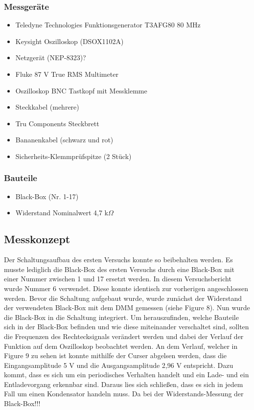 \documentclass[a4paper,12pt]{article}
\begin{document}
\subsubsection*{Messgeräte}
\begin{itemize}
\item Teledyne Technologies Funktionsgenerator T3AFG80 80 MHz
\item Keysight Oszilloskop (DSOX1102A)
\item Netzgerät (NEP-8323)?
\item Fluke 87 V True RMS Multimeter
\item Oszilloskop BNC Tastkopf mit Messklemme
\item Steckkabel (mehrere)
\item Tru Components Steckbrett
\item Bananenkabel (schwarz und rot)
\item Sicherheits-Klemmprüfspitze (2 Stück)
\end{itemize}

\subsubsection*{Bauteile}
\begin{itemize}
\item Black-Box (Nr. 1-17)
\item Widerstand Nominalwert 4,7 k$\Omega$
\end{itemize}




\subsection{Messkonzept}
Der Schaltungsaufbau des ersten Versuchs konnte so beibehalten werden. Es musste lediglich die Black-Box des ersten Versuchs durch eine Black-Box mit einer Nummer zwischen 1 und 17 ersetzt werden. In diesem Versuchsbericht wurde Nummer 6 verwendet. Diese konnte identisch zur vorherigen angeschlossen werden. Bevor die Schaltung aufgebaut wurde, wurde zunächst der Widerstand der verwendeten Black-Box mit dem DMM gemessen (siehe Figure 8). Nun wurde die Black-Box in die Schaltung integriert. Um herauszufinden, welche Bauteile sich in der Black-Box befinden und wie diese miteinander verschaltet sind, sollten die Frequenzen des Rechtecksignals verändert werden und dabei der Verlauf der Funktion auf dem Oszilloskop beobachtet werden. An dem Verlauf, welcher in Figure 9 zu sehen ist konnte mithilfe der Curser abgelsen werden, dass die Eingangsamplitude 5 V und die Ausgangsamplitude 2,96 V entspricht. Dazu kommt, dass es sich um ein periodisches Verhalten handelt und ein Lade- und ein Entladevorgang erkennbar sind. Daraus lies sich schließen, dass es sich in jedem Fall um einen Kondensator handeln muss. Da bei der Widerstands-Messung der Black-Box!!!
\end{document}
